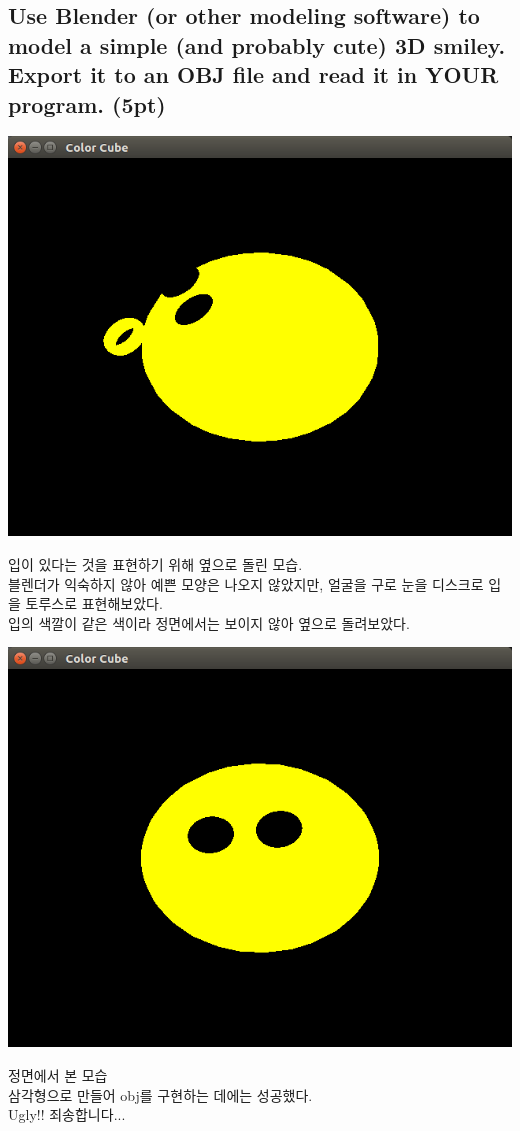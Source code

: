 \documentclass[12pt,a4paper]{article}
\begin{document}
\subsection{Use Blender (or other modeling software) to model a simple (and probably cute) 3D smiley. Export it to an OBJ file and read it in YOUR program. (5pt)}

\includegraphics[width=\textwidth]{1.png}

입이 있다는 것을 표현하기 위해 옆으로 돌린 모습.\\
블렌더가 익숙하지 않아 예쁜 모양은 나오지 않았지만, 얼굴을 구로 눈을 디스크로 입을 토루스로 표현해보았다.\\
입의 색깔이 같은 색이라 정면에서는 보이지 않아 옆으로 돌려보았다.

\includegraphics[width=\textwidth]{2.png}

정면에서 본 모습\\삼각형으로 만들어 obj를 구현하는 데에는 성공했다.\\
Ugly!! 죄송합니다...
\end{document}

